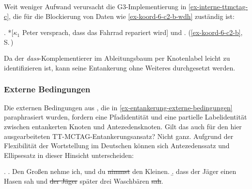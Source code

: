 Weit weniger Aufwand verursacht die G3-Implementierung in \ref{ex-interne-ttmctag-c}, die für die Blockierung von Daten wie \ref{ex-koord-6-c2-b-wdh} zuständig ist: 

\ex. *[$\kappa_1$ Peter versprach, dass das Fahrrad repariert wird] und .\label{ex-koord-6-c2-b-wdh}  \hfill (\ref{ex-koord-6-c2-b}, S.\,\pageref{ex-koord-6-c2-b})

Da der {\it dass}-Komplementierer im Ableitungsbaum per Knotenlabel leicht zu identifizieren ist, kann seine Entankerung ohne Weiteres durchgesetzt werden. 


\subsubsection*{Externe Bedingungen} 
	
Die externen Bedingungen aus \cite{Lichte:Kallmeyer:10}, die in \ref{ex-entankerung-externe-bedingungen} paraphrasiert wurden, fordern eine Pfadidentität und eine partielle Labelidentität zwischen entankerten Knoten und Antezedensknoten. Gilt das auch für den hier ausgearbeiteten TT-MCTAG-Entankerungs\-an\-satz? Nicht ganz. Aufgrund der Flexibilität der Wortstellung im Deutschen können sich Antezedenssatz und Ellipsesatz in dieser Hinsicht unterscheiden: 

\ex. \label{ex-deanchoring-10}
\a. Den Gro\ss en nehme ich, und du \sout{nimmst} den Kleinen. \hfill \citep[262]{Oirsouw:87}
\b. dass der Jäger einen Hasen sah und \sout{der Jäger} später drei Waschbären \sout{sah}.\label{ex-deanchoring-10-b}

